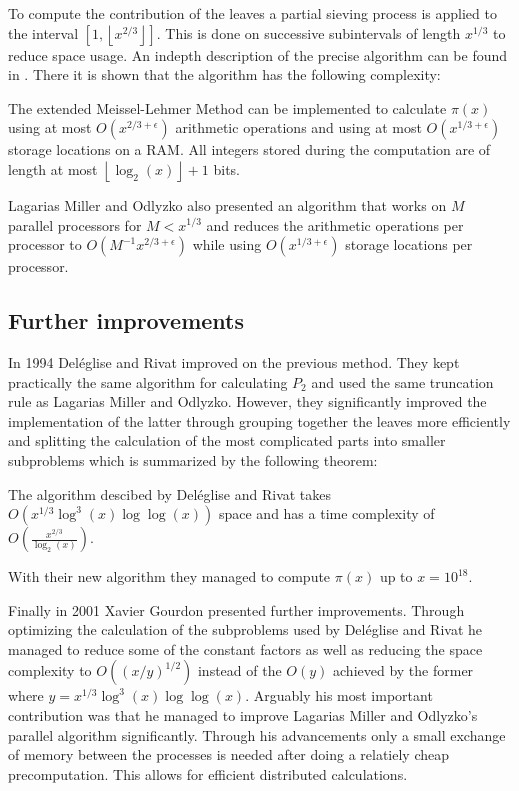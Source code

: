 To compute the contribution of the leaves a partial sieving process is applied to the interval $[1,\left\lfloor x^{2 / 3} \right\rfloor ]$.
This is done on successive subintervals of length $x^{1 / 3}$ to reduce space usage.
An indepth description of the precise algorithm  can be found in \cite{lagarias85}.
There it is shown that the algorithm has the following complexity:
\begin{theorem}
	The extended Meissel-Lehmer Method can be implemented to calculate $\pi(x)$ using at most $O(x^{2 /3 + \epsilon})$ arithmetic
	operations and using at most $O(x^{1 / 3 + \epsilon})$ storage locations on a RAM.
	All integers stored during the computation are of length at most $\left\lfloor \log_2(x)  \right\rfloor + 1$ bits.
\end{theorem}

\begin{remark}
	Lagarias Miller and Odlyzko also presented an algorithm that works on $M$ parallel processors for $M < x^{1 /3}$ and reduces the
	arithmetic operations per processor to $O(M^{-1} x^{2 / 3 + \epsilon})$ while using $O(x^{1 /3 + \epsilon})$ storage locations per processor.
\end{remark}

\subsection{Further improvements}
In 1994 Deléglise and Rivat improved on the previous method.
They kept practically the same algorithm for calculating $P_2$ and used the same truncation rule as Lagarias Miller and Odlyzko.
However, they significantly improved the implementation of the latter
through grouping together the leaves more efficiently and splitting the calculation of the most
complicated parts into smaller subproblems which is summarized by the following theorem:
\begin{theorem}
	The algorithm descibed by Deléglise and Rivat takes $O(x^{1 / 3} \log^3(x) \log \log(x))$ space
	and has a time complexity of $O(\frac{x^{2 / 3}}{\log_2(x)})$.
\end{theorem}
With their new algorithm they managed to compute $\pi(x)$ up to $x = 10^{18}$.

Finally in 2001 Xavier Gourdon presented further improvements. Through optimizing the calculation
of the subproblems used by Deléglise and Rivat he managed to reduce some of the constant factors as well as
reducing the space complexity to $O((x / y)^{1 / 2})$ instead of the $O(y)$ achieved by the former
where $y = x^{1 / 3} \log^3(x) \log \log(x)$.
Arguably his most important contribution was that he managed to improve Lagarias Miller and Odlyzko's 
parallel algorithm significantly. Through his advancements only a small exchange of memory between the processes is needed
after doing a relatiely cheap precomputation.
This allows for efficient distributed calculations.

